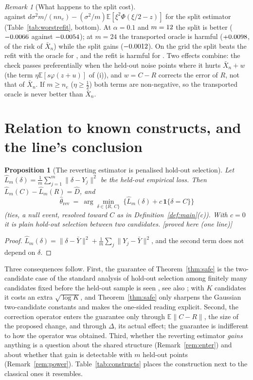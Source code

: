 \documentclass[10pt,a4paper]{article}
\theoremstyle{plain}
\newtheorem{proposition}[theorem]{Proposition}
\theoremstyle{definition}
\theoremstyle{remark}
\newtheorem{remark}[theorem]{Remark}
\newcommand{\E}{\mathbb{E}}
\newcommand{\Dh}{\widehat{D}}
\newcommand{\rev}{\mathrm{rev}}
\newcommand{\Ybar}{\bar{Y}}
\newcommand{\norm}[1]{\lVert #1\rVert}
\newcommand{\status}[1]{\textsf{\small [#1]}}
\begin{document}
\begin{remark}[What happens to the split cost]
\[\]
against $d\sigma^2m/(nn_e)-(\sigma^2/m)\E[\xi^2\Phi(\xi/2-z)]$ for the split estimator (Table~\ref{tab:worstrefit}, bottom). At $\alpha=0.1$ and $m=12$ the split is better ($-0.0066$ against $-0.0054$); at $m=24$ the transported oracle is harmful ($+0.0098$, \RfOraRfTenTwentyFourPct{} of the risk of $\bar X_n$) while the split gains ($-0.0012$). On the grid the split beats the refit with the oracle for \RfOraSplitBetterText, and the refit is harmful for \RfOraHarmText. Two effects combine: the check passes preferentially when the held-out noise points where it hurts $\bar X_n+w$ (the term $\eta\E[s\varphi(z+u)]$ of (i)), and $w=C-R$ corrects the error of $R$, not that of $\bar X_n$. If $m\ge n_e$ ($\eta\ge\tfrac12$) both terms are non-negative, so the transported oracle is never better than $\bar X_n$.
\end{remark}


\section{Relation to known constructs, and the line's conclusion}\label{sec:related}

\begin{proposition}[The reverting estimator is penalised hold-out selection]\label{prop:select}
Let $\hat L_m(\delta)=\frac1m\sum_{j=1}^m\norm{\delta-Y_j}^2$ be the held-out empirical loss. Then $\hat L_m(C)-\hat L_m(R)=\Dh$, and
\[
\hat\theta_\rev\ =\ \arg\min_{\delta\in\{R,\,C\}}\ \big\{\hat L_m(\delta)+c\,\mathbf 1\{\delta=C\}\big\}
\]
(ties, a null event, resolved toward $C$ as in Definition~\ref{def:main}(c)). With $c=0$ it is plain hold-out selection between two candidates. \status{proved here (one line)}
\end{proposition}
\begin{proof}
$\hat L_m(\delta)=\norm{\delta-\Ybar}^2+\frac1m\sum_j\norm{Y_j-\Ybar}^2$, and the second term does not depend on $\delta$.
\end{proof}

Three consequences follow. First, the guarantee of Theorem~\ref{thm:safe} is the two-candidate case of the standard analysis of hold-out selection among finitely many candidates fixed before the held-out sample is seen \citep[\S 8.4; see also Ch.~22]{devroye1996}, see also \citet{arlotcelisse2010}; with $K$ candidates it costs an extra $\sqrt{\log K}$, and Theorem~\ref{thm:safe} only sharpens the Gaussian two-candidate constants and makes the one-sided reading explicit. Second, the correction operator enters the guarantee only through $\E\norm{C-R}$, the size of the proposed change, and through $\Delta$, its actual effect; the guarantee is indifferent to how the operator was obtained. Third, whether the reverting estimator \emph{gains} anything is a question about the shared structure (Remark~\ref{rem:enter}) and about whether that gain is detectable with $m$ held-out points (Remark~\ref{rem:power}). Table~\ref{tab:constructs} places the construction next to the classical ones it resembles.
\end{document}
